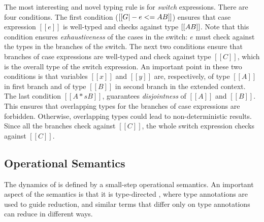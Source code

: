 The most interesting and novel typing rule is for
\emph{switch} expressions. There are four conditions.
The first condition ($[[G |-
    e <= A \/ B]]$) ensures that case expression $[[e]]$ is well-typed
and checks against type $[[A \/ B]]$. Note that this condition ensures
\emph{exhaustiveness} of the cases in the switch: $e$ must
check against the types in the branches of the switch. 
The next two conditions ensure that
branches of case expressions are well-typed and check against type
$[[C]]$, which is the overall type of the switch expression.
An important point in these two conditions is that variables
$[[x]]$ and $[[y]]$ are, respectively, of type $[[A]]$ in first branch and of type $[[B]]$ in
second branch in the extended context. 
The last condition
$[[A *s B]]$, guarantees \emph{disjointness} of $[[A]]$ and $[[B]]$.
This ensures that overlapping types for the branches of case expressions
are forbidden. Otherwise, overlapping types could lead to
non-deterministic results.
Since all the branches check against $[[C]]$, the whole
switch expression checks against $[[C]]$.

\begin{comment}
\begin{figure}[t]
  \begin{small}
    \centering
    \drules[typ]{$ [[G |- e dirflag A]] $}{Bi-directional Typing}{int, var, ann, app, sub, abs, typeof}
  \end{small}
  \caption{Typing for \cal.}
  \label{fig:union:typ}
\end{figure}
\end{comment}

\subsection{Operational Semantics}
\label{sec:union:os}
The dynamics of \cal is defined by a small-step operational semantics. An
important aspect of the semantics is that it is type-directed
\cite{Huang:typedirected}, where type annotations are used to guide reduction,
and similar terms that differ only on type annotations can reduce in different
ways.

